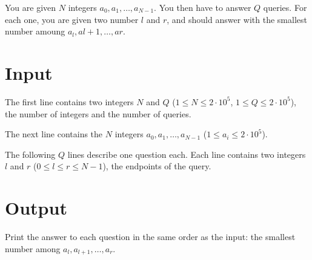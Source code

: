 
You are given $N$ integers $a_0, a_1, \dots, a_{N-1}$. You then have to answer $Q$ queries. For each one,
you are given two number $l$ and $r$, and should answer with the smallest number amoung $a_l,a{l+1},\dots,a{r}$.

\section*{Input}
The first line contains two integers $N$ and $Q$ ($1 \leq N \leq 2 \cdot 10^5$, $1 \leq Q \leq 2 \cdot 10^5$),
the number of integers and the number of queries.

The next line contains the $N$ integers $a_0, a_1, \dots, a_{N-1}$ ($1 \leq a_i \leq 2 \cdot 10^5$).

The following $Q$ lines describe one question each. Each line contains two integers $l$ and $r$ ($0 \leq l \leq r \leq N-1$),
the endpoints of the query.


\section*{Output}
Print the answer to each question in the same order as the input: the smallest number among $a_l, a_{l+1},\dots,a_{r}$.
